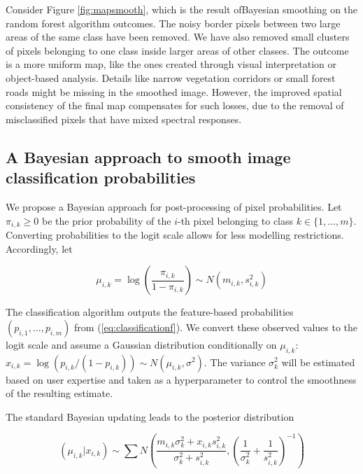 \documentclass[
  shortnames]{jss}
\begin{document}
Consider Figure \ref{fig:mapsmooth}, which is the result ofBayesian smoothing on the random forest algorithm outcomes. The noisy border pixels between two large areas of the same class have been removed. We have also removed small clusters of pixels belonging to one class inside larger areas of other classes. The outcome is a more uniform map, like the ones created through visual interpretation or object-based analysis. Details like narrow vegetation corridors or small forest roads might be missing in the smoothed image. However, the improved spatial consistency of the final map compensates for such losses, due to the removal of misclassified pixels that have mixed spectral responses.

\hypertarget{a-bayesian-approach-to-smooth-image-classification-probabilities}{%
\subsection{A Bayesian approach to smooth image classification probabilities}\label{a-bayesian-approach-to-smooth-image-classification-probabilities}}

We propose a Bayesian approach for post-processing of pixel probabilities. Let \(\pi_{i,k} \geq 0\) be the prior probability of the \(i\)-th pixel belonging to class \(k \in \{1, \ldots, m\}\).
Converting probabilities to the logit scale allows for less modelling restrictions. Accordingly, let

\begin{equation} 
\mu_{i,k} = \log\left( \frac{\pi_{i,k}}{1-\pi_{i,k}} \right) \sim N(m_{i,k}, s^2_{i,k}) 
\end{equation}

The classification algorithm outputs the feature-based probabilities \((p_{i,1}, \ldots, p_{i,m})\) from (\ref{eq:classificationf}). We convert these observed values to the logit
scale and assume a Gaussian distribution conditionally on \(\mu_{i,k}\):
\(x_{i,k} = \log(p_{i,k}/(1-p_{i,k})) \sim N(\mu_{i,k}, \sigma^2)\).
The variance \(\sigma^2_{k}\) will be estimated based on user expertise and taken as a hyperparameter to control the smoothness of the resulting estimate.

The standard Bayesian updating \citep{Gelman2014} leads to the posterior distribution

\begin{equation}
(\mu_{i,k} | x_{i,k}) \sim \sum N\left(  \frac{m_{i,k} \sigma^2_{k} +
    x_{i,k} s^2_{i,k}}{ \sigma^2_{k} +s^2_{i,k}} , \left( \frac{1}{\sigma_k^2} + \frac{1}{s^2_{i,k}} \right)^{-1} \right) 
\label{eq:BayesUpdate}
\end{equation}
\end{document}
